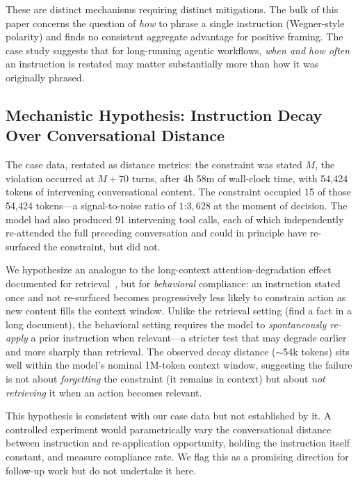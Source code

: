 \documentclass[11pt,a4paper]{article}
\begin{document}
These are distinct mechanisms requiring distinct mitigations. The bulk of this paper concerns the question of \emph{how} to phrase a single instruction (Wegner-style polarity) and finds no consistent aggregate advantage for positive framing. The case study suggests that for long-running agentic workflows, \emph{when and how often} an instruction is restated may matter substantially more than how it was originally phrased.

\subsection{Mechanistic Hypothesis: Instruction Decay Over Conversational Distance}
\label{sec:decay-hypothesis}

The case data, restated as distance metrics: the constraint was stated $M$, the violation occurred at $M + 70$ turns, after 4h 58m of wall-clock time, with 54{,}424 tokens of intervening conversational content. The constraint occupied 15 of those 54{,}424 tokens---a signal-to-noise ratio of $1$:$3{,}628$ at the moment of decision. The model had also produced 91 intervening tool calls, each of which independently re-attended the full preceding conversation and could in principle have re-surfaced the constraint, but did not.

We hypothesize an analogue to the long-context attention-degradation effect documented for retrieval~\citep{liu2024lostmiddle,hsieh2024ruler}, but for \emph{behavioral} compliance: an instruction stated once and not re-surfaced becomes progressively less likely to constrain action as new content fills the context window. Unlike the retrieval setting (find a fact in a long document), the behavioral setting requires the model to \emph{spontaneously re-apply} a prior instruction when relevant---a stricter test that may degrade earlier and more sharply than retrieval. The observed decay distance ($\sim$54k tokens) sits well within the model's nominal 1M-token context window, suggesting the failure is not about \emph{forgetting} the constraint (it remains in context) but about \emph{not retrieving} it when an action becomes relevant.

This hypothesis is consistent with our case data but not established by it. A controlled experiment would parametrically vary the conversational distance between instruction and re-application opportunity, holding the instruction itself constant, and measure compliance rate. We flag this as a promising direction for follow-up work but do not undertake it here.
\end{document}
